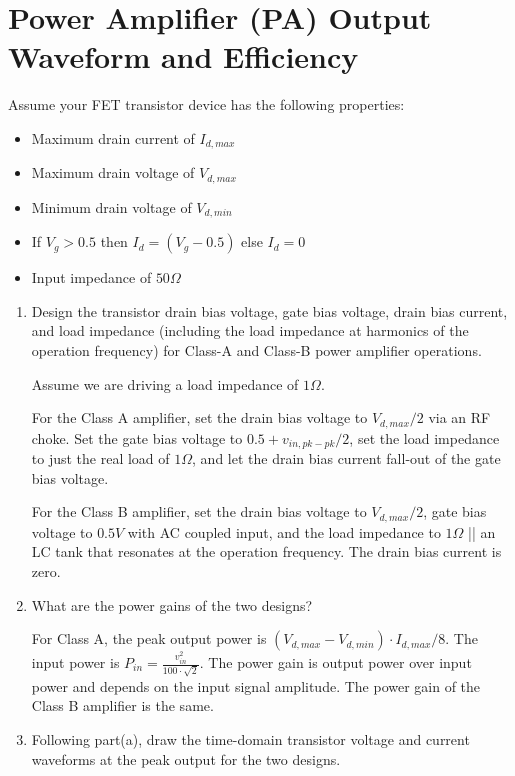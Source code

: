 \section{Power Amplifier (PA) Output Waveform and Efficiency}
{\color{blue} Assume your FET transistor device has the following properties:
\begin{itemize}
    \item Maximum drain current of $I_{d,max}$
    \item Maximum drain voltage of $V_{d,max}$
    \item Minimum drain voltage of $V_{d,min}$
    \item If $V_g > 0.5$ then $I_d = (V_g - 0.5)$ else $I_d = 0$
    \item Input impedance of $50 \Omega$
\end{itemize}}
\begin{enumerate}[label=(\alph*)]
    \item {\color{blue} Design the transistor drain bias voltage, gate bias voltage, drain bias current, and load impedance (including the load impedance at harmonics of the operation frequency) for Class-A and Class-B power amplifier operations.}

    Assume we are driving a load impedance of $1 \Omega$.

    For the Class A amplifier, set the drain bias voltage to $V_{d,max} / 2$ via an RF choke. Set the gate bias voltage to $0.5 + v_{in,pk-pk}/2$, set the load impedance to just the real load of $1 \Omega$, and let the drain bias current fall-out of the gate bias voltage.

    For the Class B amplifier, set the drain bias voltage to $V_{d,max} / 2$, gate bias voltage to $0.5 V$ with AC coupled input, and the load impedance to $1 \Omega$ || an LC tank that resonates at the operation frequency. The drain bias current is zero.

    \item {\color{blue} What are the power gains of the two designs?}

    For Class A, the peak output power is $(V_{d,max} - V_{d,min}) \cdot I_{d,max} / 8$. The input power is $P_{in} = \frac{v_{in}^2}{100 \cdot \sqrt{2}}$. The power gain is output power over input power and depends on the input signal amplitude.
    The power gain of the Class B amplifier is the same.

    \item {\color{blue} Following part(a), draw the time-domain transistor voltage and current waveforms at the peak output for the two designs.}


\end{enumerate}
